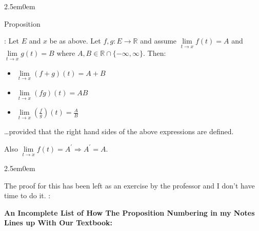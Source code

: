 \documentclass{book}
\newcommand{\hTwo}{%
   \color{MidnightBlue}%
   \fontsize{13}{15}\selectfont%
}
\newcommand{\hThree}{%
   \color{PineGreen}
   \fontsize{13}{15}\selectfont%
}
\newcommand{\exOne}{%
   \color{Purple}%
   \fontsize{14}{16}\selectfont%
}
\newenvironment{myIndent}{%
   \begin{adjustwidth}{2.5em}{0em}%
}{%
   \end{adjustwidth}%
}
\newcommand{\retTwo}{\hfill\bigbreak}
\newcounter{PropNumber}
\newcommand{\propCount}[1][1]{%
   \addtocounter{PropNumber}{#1}%
   \thePropNumber%
}
\begin{document}
   {\begin{myIndent} \hTwo
      Proposition \propCount: Let $E$ and $x$ be as above. Let $f, g: E \rightarrow \mathbb{R}$ and assume $\lim\limits_{t\rightarrow x}f(t) = A$ and  $\lim\limits_{t\rightarrow x}g(t) = B$ where $A, B \in \mathbb{R} \cap \{-\infty, \infty\}$. Then:
      \begin{itemize}
         \item $\lim\limits_{t \rightarrow x}(f + g)(t) = A + B$
         \item $\lim\limits_{t \rightarrow x}(fg)(t) = AB$
         \item $\lim\limits_{t \rightarrow x}(\frac{f}{g})(t) = \frac{A}{B}$
      \end{itemize}
      \dots provided that the right hand sides of the above expressions are defined. \retTwo

      Also $\lim\limits_{t \rightarrow x}f(t) = A^\prime \Longrightarrow A^\prime = A$. \retTwo
      
      {\begin{myIndent} \hThree
         The proof for this has been left as an exercise by the professor and I don't have time to do it. :\rparen
      \end{myIndent}}
   \end{myIndent}}

   \newpage
   {\huge \color{Black} \textbf{An Incomplete List of How The Proposition Numbering in my Notes Lines up With Our Textbook:} \retTwo}
   \exOne
   
\end{document}
